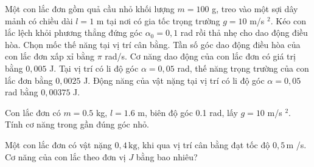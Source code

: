 \begin{ex}
Một con lắc đơn gồm quả cầu nhỏ khối lượng $m = 100$ g, treo vào một sợi dây mảnh có chiều dài $l = 1$ m tại nơi có gia tốc trọng trường $g = 10$ m/s $^2$. Kéo con lắc lệch khỏi phương thẳng đứng góc $\alpha_0 = 0,1$ rad rồi thả nhẹ cho dao động điều hòa. Chọn mốc thế năng tại vị trí cân bằng.
\choiceTF
{\True Tần số góc dao động điều hòa của con lắc đơn xấp xỉ bằng $\pi$ rad/s.}
{\True Cơ năng dao động của con lắc đơn có giá trị bằng $0,005$ J.}
{Tại vị trí có li độ góc $\alpha = 0,05$ rad, thế năng trọng trường của con lắc đơn bằng $0,0025$ J.}
{\True Động năng của vật nặng tại vị trí có li độ góc $\alpha = 0,05$ rad bằng $0,00375$ J.}
\end{ex}

\begin{bt}
Con lắc đơn có $m=0.5$ kg, $l=1.6$ m, biên độ góc 0.1 rad, lấy $g=10$ m/s $^2$. Tính cơ năng trong gần đúng góc nhỏ.
\end{bt}

\begin{ex}
Một con lắc đơn có vật nặng $0,4\,\text{kg}$, khi qua vị trí cân bằng đạt tốc độ $0,5\,\text{m}$ /s. Cơ năng của con lắc theo đơn vị $J$ bằng bao nhiêu?
\end{ex}

